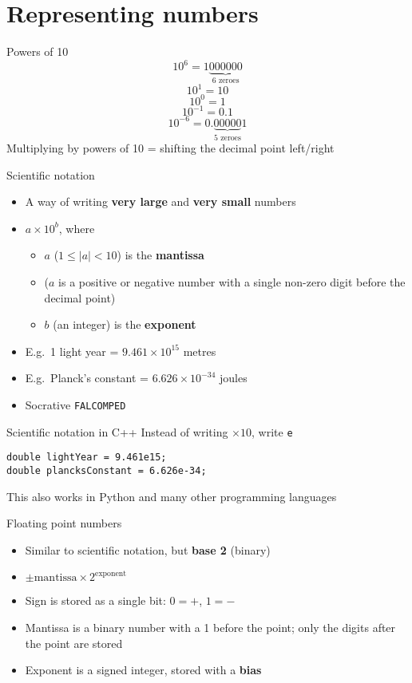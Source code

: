 \part{Representing numbers}
\frame{\partpage}

\begin{frame}{Powers of 10}
	\pause
	$$ 10^6 = 1\underbrace{000000}_{\text{6 zeroes}} $$
	\pause
	$$ 10^1 = 10 $$
	\pause
	$$ 10^0 = 1 $$
	\pause
	$$ 10^{-1} = 0.1 $$
	\pause
	$$ 10^{-6} = 0.\underbrace{00000}_{\text{5 zeroes}}1 $$
	\pause
	Multiplying by powers of 10 = shifting the decimal point left/right
\end{frame}

\begin{frame}{Scientific notation}
	\begin{itemize}
		\pause\item A way of writing \textbf{very large} and \textbf{very small} numbers
		\pause\item $a \times 10^b$, where
			\begin{itemize}
				\pause\item $a$ ($1 \leq |a| < 10$) is the \textbf{mantissa}
				\pause\item ($a$ is a positive or negative number
					with a single non-zero digit before the decimal point)
				\pause\item $b$ (an integer) is the \textbf{exponent}
			\end{itemize}
		\pause\item E.g.\ 1 light year = $9.461 \times 10^{15}$ metres
		\pause\item E.g.\ Planck's constant = $6.626 \times 10^{-34}$ joules
		\pause\item Socrative \texttt{FALCOMPED}
	\end{itemize}
\end{frame}

\begin{frame}[fragile]{Scientific notation in C++}
	\pause Instead of writing $\times 10$, write \lstinline{e}
	\pause
	\begin{lstlisting}
double lightYear = 9.461e15;
double plancksConstant = 6.626e-34;
	\end{lstlisting}
	\pause This also works in Python and many other programming languages
\end{frame}

\begin{frame}{Floating point numbers}
	\begin{itemize}
		\pause\item Similar to scientific notation, but \textbf{base 2} (binary)
		\pause\item $\pm \text{mantissa} \times 2^{\text{exponent}}$
		\pause\item Sign is stored as a single bit: $0=+$, $1=-$
		\pause\item Mantissa is a binary number with a 1 before the point;
			only the digits after the point are stored
		\pause\item Exponent is a signed integer, stored with a \textbf{bias}
	\end{itemize}
\end{frame}

